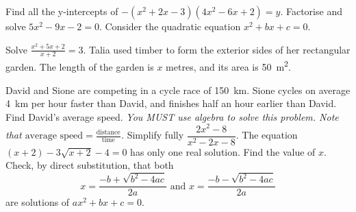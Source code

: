 \begin{questions}
  \question Find all the y-intercepts of $ -(x^2 + 2x - 3)(4x^2 - 6x + 2) = y $.
  \question Factorise and solve $ 5x^2 - 9x - 2 = 0 $.
  \question Consider the quadratic equation $ x^2 + bx + c = 0 $.
  \question Solve $ \frac{x^2 + 5x + 2}{x + 2} = 3 $.
  \question Talia used timber to form the exterior sides of her rectangular garden. The length
            of the garden is $ x $ metres, and its area is \SI{50}{\metre\squared}.
  \question David and Sione are competing in a cycle race of \SI{150}{\kilo\metre}. Sione cycles on average \SI{4}{\kilo\metre} per hour
            faster than David, and finishes half an hour earlier than David. Find David's average speed. \textit{You MUST use algebra to
            solve this problem. Note that $ \text{average speed} = \frac{\text{distance}}{\text{time}} $.}
  \question Simplify fully $ \dfrac{2x^2 - 8}{x^2 - 2x - 8} $.
  \question The equation $ (x + 2) - 3\sqrt{x + 2} - 4 = 0 $ has only one real solution. Find the value of $ x $.
  \question Check, by direct substitution, that both
            \begin{displaymath}
              x = \frac{-b + \sqrt{b^2 - 4ac}}{2a} \text{ and } x = \frac{-b - \sqrt{b^2 - 4ac}}{2a}
            \end{displaymath}
            are solutions of $ ax^2 + bx + c = 0 $.
  \question
    \begin{parts}

\end{parts}
\end{questions}
